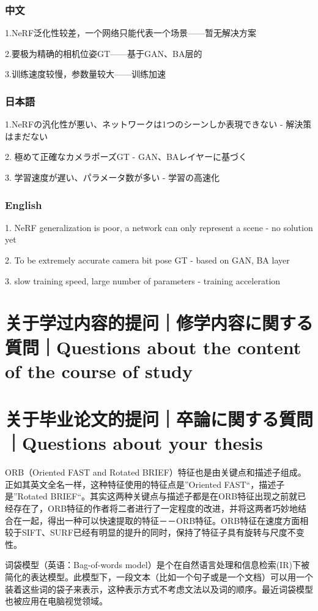 \documentclass[lang=cn,11pt,a4paper]{elegantpaper}
\begin{document}
\subsubsection{中文}
1.NeRF泛化性较差，一个网络只能代表一个场景——暂无解决方案

2.要极为精确的相机位姿GT——基于GAN、BA层的

3.训练速度较慢，参数量较大——训练加速
\subsubsection{日本語}
1.NeRFの汎化性が悪い、ネットワークは1つのシーンしか表現できない - 解決策はまだない

2. 極めて正確なカメラポーズGT - GAN、BAレイヤーに基づく

3. 学習速度が遅い、パラメータ数が多い - 学習の高速化
\subsubsection{English}
1. NeRF generalization is poor, a network can only represent a scene - no solution yet

2. To be extremely accurate camera bit pose GT - based on GAN, BA layer

3. slow training speed, large number of parameters - training acceleration

\section{关于学过内容的提问｜修学内容に関する質問｜Questions about the content of the course of study}


\section{关于毕业论文的提问｜卒論に関する質問｜Questions about your thesis}
ORB（Oriented FAST and Rotated BRIEF）特征也是由关键点和描述子组成。正如其英文全名一样，这种特征使用的特征点是”Oriented FAST“，描述子是”Rotated BRIEF“。其实这两种关键点与描述子都是在ORB特征出现之前就已经存在了，ORB特征的作者将二者进行了一定程度的改进，并将这两者巧妙地结合在一起，得出一种可以快速提取的特征－－ORB特征。ORB特征在速度方面相较于SIFT、SURF已经有明显的提升的同时，保持了特征子具有旋转与尺度不变性。

词袋模型（英语：Bag-of-words model）是个在自然语言处理和信息检索(IR)下被简化的表达模型。此模型下，一段文本（比如一个句子或是一个文档）可以用一个装着这些词的袋子来表示，这种表示方式不考虑文法以及词的顺序。最近词袋模型也被应用在电脑视觉领域。
\end{document}
